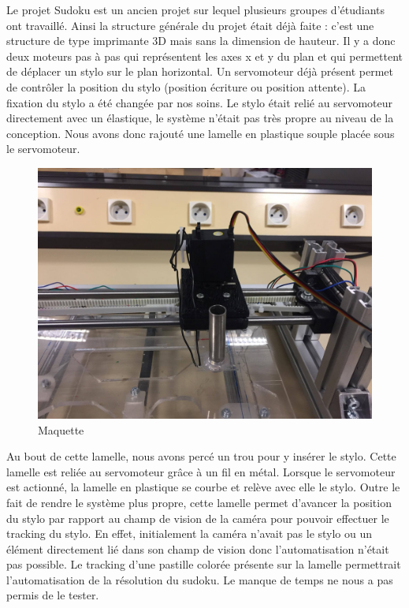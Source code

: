 \documentclass[12pt]{article}
\begin{document}
Le projet Sudoku est un ancien projet sur lequel plusieurs groupes d'étudiants ont travaillé. Ainsi la structure générale du projet était déjà faite : c'est une structure de type imprimante 3D mais sans la dimension de hauteur. Il y a donc deux moteurs pas à pas qui représentent les axes x et y du plan et qui permettent de déplacer un stylo sur le plan horizontal. Un servomoteur déjà présent permet de contrôler la position du stylo (position écriture ou position attente). La fixation du stylo a été changée par nos soins. Le stylo était relié au servomoteur directement avec un élastique, le système n'était pas très propre au niveau de la conception. Nous avons donc rajouté une lamelle en plastique souple placée sous le servomoteur.
\begin{figure}[!h]
	\centering
   	\includegraphics[scale = 0.17]{e1.jpg}
   	\caption{\label{mq} Maquette }
\end{figure}
Au bout de cette lamelle, nous avons percé un trou pour y insérer le stylo. Cette lamelle est reliée au servomoteur grâce à un fil en métal. Lorsque le servomoteur est actionné, la lamelle en plastique se courbe et relève avec elle le stylo. Outre le fait de rendre le système plus propre, cette lamelle permet d'avancer la position du stylo par rapport au champ de vision de la caméra pour pouvoir effectuer le tracking du stylo. En effet, initialement la caméra n'avait pas le stylo ou un élément directement lié dans son champ de vision donc l'automatisation n'était pas possible. Le tracking d'une pastille colorée présente sur la lamelle permettrait l'automatisation de la résolution du sudoku. Le manque de temps ne nous a pas permis de le tester.\\
\end{document}
